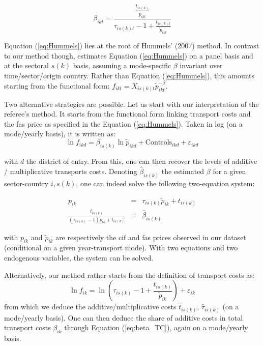 \documentclass[a4paper,11pt]{article}
\begin{document}
\begin{itemize}
     \begin{equation}
     \beta_{ikt} = \frac{\frac{t_{is(k)}}{\widetilde{p}_{ikt}}}{\tau_{is(k)t}-1+\frac{t_{is(k)t}}{\widetilde{p}_{ikt}} } \label{eq:beta_TC}
     \end{equation}

     Equation (\ref{eq:Hummels}) lies at the root of Hummels' (2007) method. In contrast to our method though, \cite{hummels2007} estimates Equation (\ref{eq:Hummels}) on a panel basis and at the sectoral $s(k)$ basis, assuming a mode-specific $\beta$ invariant over time/sector/origin country. Rather than Equation (\ref{eq:Hummels}), this amounts starting from the functional form: $f_{ikt} = X_{is(k)t}\widetilde{p}_{ikt}^{-\beta}$.

     Two alternative strategies are possible. Let us start with our interpretation of the referee's method. It starts from the functional form linking transport costs and the fas price as specified in the Equation (\ref{eq:Hummels}). Taken in log (on a mode/yearly basis), it is written as:
     $$\ln f_{ikd} = \beta_{is(k)}\ln \widetilde{p}_{ikd} +\text{Controls}_{ikd}+ \varepsilon_{ikd}$$

     \noindent with $d$ the district of entry. From this, one can then recover the levels of additive / multiplicative transports costs. Denoting $\widehat{\beta}_{is(k)}$ the estimated $\beta$ for a given sector-country $i,s(k)$, one can indeed solve the following two-equation system:

\begin{eqnarray}
p_{ik} &=& \tau_{is(k)}\widetilde{p}_{ik} +t_{is(k)} \label{eq:system1}\\
\frac{t_{is(k)}}{(\tau_{is(k)}-1)\widetilde{p}_{ik}+ t_{is(k)}} &=& \widehat{\beta}_{is(k)}  \label{eq:system2}
\end{eqnarray}

\noindent with $p_{ik}$ and $\widetilde{p}_{ik}$ are respectively the cif and fas prices observed in our dataset (conditional on a given year-transport mode). With two equations and two endogenous variables, the system can be solved.

 Alternatively, our method rather starts from the definition of transport costs as:
     $$\ln f_{ik} = \ln\left(\tau_{is(k)} -1 + \frac{t_{is(k)}}{\widetilde{p}_{ik}}\right) +\varepsilon_{ik}$$
\noindent from which we deduce the additive/multiplicative costs $\widehat{t}_{is(k)}$, $\widehat{\tau}_{is(k)}$ (on a mode/yearly basis). One can then deduce the share of additive costs in total transport costs $\beta_{ik}$ through Equation (\ref{eq:beta_TC}), again on a mode/yearly basis.



\end{itemize}
\end{document}

